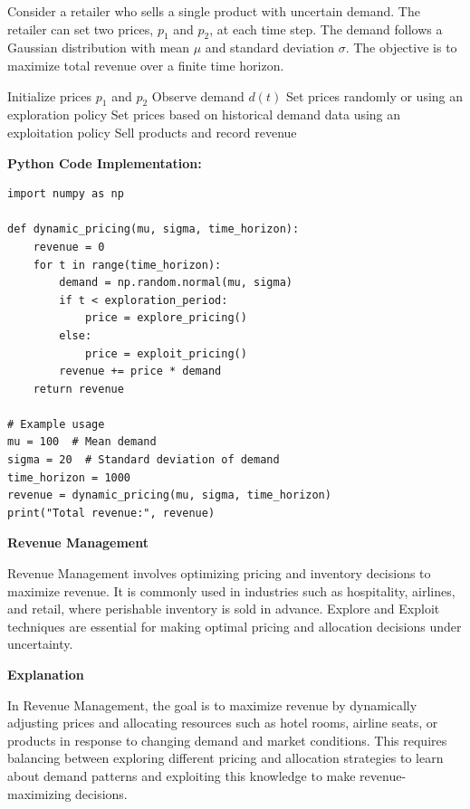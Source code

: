 \documentclass[12pt]{book} %
\begin{document}
Consider a retailer who sells a single product with uncertain demand. The retailer can set two prices, \(p_1\) and \(p_2\), at each time step. The demand follows a Gaussian distribution with mean \(\mu\) and standard deviation \(\sigma\). The objective is to maximize total revenue over a finite time horizon.
\FloatBarrier
\begin{algorithm}
\caption{Explore-Exploit for Dynamic Pricing}
\begin{algorithmic}[1]
\State Initialize prices $p_1$ and $p_2$
    \State Observe demand $d(t)$
        \State Set prices randomly or using an exploration policy
    \Else
        \State Set prices based on historical demand data using an exploitation policy
    \EndIf
    \State Sell products and record revenue
\EndFor
\end{algorithmic}
\end{algorithm}
\FloatBarrier
\textbf{Python Code Implementation:}
\FloatBarrier
\begin{lstlisting}
import numpy as np

def dynamic_pricing(mu, sigma, time_horizon):
    revenue = 0
    for t in range(time_horizon):
        demand = np.random.normal(mu, sigma)
        if t < exploration_period:
            price = explore_pricing()
        else:
            price = exploit_pricing()
        revenue += price * demand
    return revenue

# Example usage
mu = 100  # Mean demand
sigma = 20  # Standard deviation of demand
time_horizon = 1000
revenue = dynamic_pricing(mu, sigma, time_horizon)
print("Total revenue:", revenue)
\end{lstlisting}
\FloatBarrier

\textbf{Revenue Management}

Revenue Management involves optimizing pricing and inventory decisions to maximize revenue. It is commonly used in industries such as hospitality, airlines, and retail, where perishable inventory is sold in advance. Explore and Exploit techniques are essential for making optimal pricing and allocation decisions under uncertainty.

\textbf{Explanation}

In Revenue Management, the goal is to maximize revenue by dynamically adjusting prices and allocating resources such as hotel rooms, airline seats, or products in response to changing demand and market conditions. This requires balancing between exploring different pricing and allocation strategies to learn about demand patterns and exploiting this knowledge to make revenue-maximizing decisions.
\end{document}
